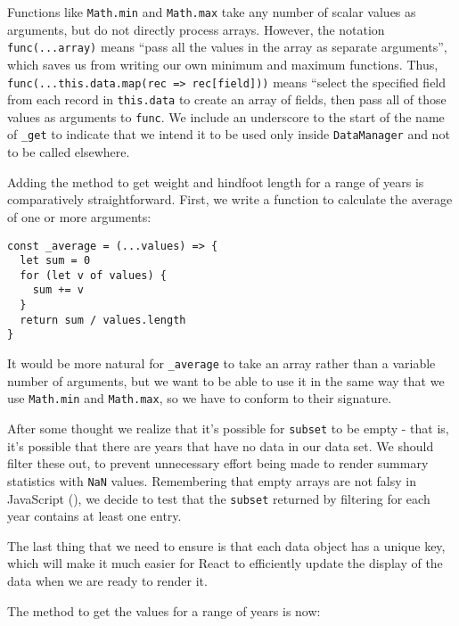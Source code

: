 Functions like \texttt{Math.min} and \texttt{Math.max} take any number of scalar values as arguments,
but do not directly process arrays.
However, the notation \texttt{func(...array)} means
``pass all the values in the array as separate arguments'',
which saves us from writing our own minimum and maximum functions.
Thus,
\texttt{func(...this.data.map(rec\ =\textgreater{}\ rec[field]))} means
``select the specified field from each record in \texttt{this.data} to create an array of fields,
then pass all of those values as arguments to \texttt{func}.
We include an underscore to the start of the name of \texttt{\_get} to indicate that we
intend it to be used only inside \texttt{DataManager} and not to be called elsewhere.

Adding the method to get weight and hindfoot length for a range of years
is comparatively straightforward.
First,
we write a function to calculate the average of one or more arguments:

\begin{verbatim}
const _average = (...values) => {
  let sum = 0
  for (let v of values) {
    sum += v
  }
  return sum / values.length
}
\end{verbatim}

It would be more natural for \texttt{\_average} to take an array rather than a variable number of arguments,
but we want to be able to use it in the same way that we use \texttt{Math.min} and \texttt{Math.max},
so we have to conform to their signature.

After some thought we realize that it's possible for \texttt{subset} to be empty -
that is, it's possible that there are years that have no data in our data set.
We should filter these out,
to prevent unnecessary effort being made to render summary statistics with \texttt{NaN} values.
Remembering that empty arrays are not falsy in JavaScript (),
we decide to test that the \texttt{subset} returned by filtering for each year
contains at least one entry.

The last thing that we need to ensure is that each data object has a unique key,
which will make it much easier for React to efficiently update the display of
the data when we are ready to render it.

The method to get the values for a range of years is now:

